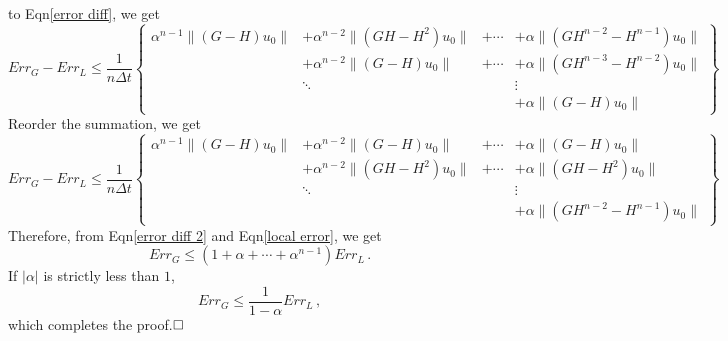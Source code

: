 \documentclass[a4paper,onecolumn]{article}
\theoremstyle{remark}
\begin{document}
\begin{appendices}
    to Eqn\eqref{error diff}, we get
    \begin{equation}
        Err_G - Err_L \le 
        \frac{1}{n\Delta t}
        \left\{\begin{split}
            \alpha^{n-1}\|(G - H)u_0\| &+ \alpha^{n-2}\|(GH - H^2)u_0\|&+\cdots
            &+ \alpha\|(GH^{n-2} - H^{n-1})u_0\|\\
            &+\alpha^{n-2}\|( G - H)u_0\| &+ \cdots 
            &+ \alpha\|(GH^{n-3} - H^{n-2})u_0\|\\
            &\ddots&& \vdots\\
            &&& + \alpha\|(G - H)u_0\|
        \end{split}
        \right\}
        \label{error diff}
    \end{equation}
    Reorder the summation, we get
    \begin{equation}
        Err_G - Err_L \le 
        \frac{1}{n\Delta t}
        \left\{\begin{split}
            \alpha^{n-1}\|(G - H)u_0\| &+ \alpha^{n-2}\|(G - H)u_0\|&+\cdots
            &+ \alpha\|(G - H)u_0\|\\
            &+\alpha^{n-2}\|( GH - H^2)u_0\| &+ \cdots 
            &+ \alpha\|(GH - H^{2})u_0\|\\
            &\ddots&& \vdots\\
            &&& + \alpha\|(GH^{n-2} - H^{n-1})u_0\|
        \end{split}
        \right\}
        \label{error diff 2}
    \end{equation}
    Therefore, from Eqn\eqref{error diff 2} and Eqn\eqref{local error}, we get
    \begin{equation}
        Err_G \le (1+\alpha+\cdots+\alpha^{n-1}) Err_L\,.
    \end{equation}
    If $|\alpha|$ is strictly less than $1$, 
    \begin{equation}
        Err_G \le \frac{1}{1-\alpha} Err_L\,,
    \end{equation}
    which completes the proof.$\hfill\Box$


\end{appendices}
\end{document}
